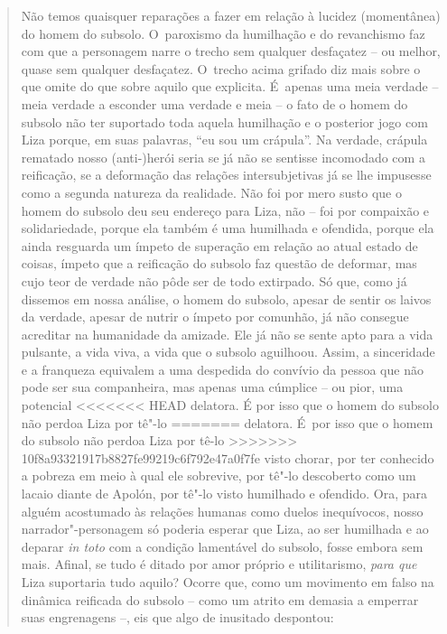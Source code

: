 {\begin{quote}
Não temos quaisquer reparações a fazer em relação à lucidez (momentânea)
do homem do subsolo. O~paroxismo da humilhação e do revanchismo faz com
que a personagem narre o trecho sem qualquer desfaçatez -- ou melhor,
quase sem qualquer desfaçatez. O~trecho acima grifado diz mais sobre o
que omite do que sobre aquilo que explicita. É~apenas uma meia verdade
-- meia verdade a esconder uma verdade e meia -- o fato de o homem do
subsolo não ter suportado toda aquela humilhação e o posterior jogo com
Liza porque, em suas palavras, ``eu sou um crápula''. Na verdade,
crápula rematado nosso (anti-)herói seria se já não se sentisse
incomodado com a reificação, se a deformação das relações
intersubjetivas já se lhe impusesse como a segunda natureza da
realidade. Não foi por mero susto que o homem do subsolo deu seu
endereço para Liza, não -- foi por compaixão e solidariedade, porque ela
também é uma humilhada e ofendida, porque ela ainda resguarda um ímpeto
de superação em relação ao atual estado de coisas, ímpeto que a
reificação do subsolo faz questão de deformar, mas cujo teor de verdade
não pôde ser de todo extirpado. Só que, como já dissemos em nossa
análise, o homem do subsolo, apesar de sentir os laivos da verdade,
apesar de nutrir o ímpeto por comunhão, já não consegue acreditar na
humanidade da amizade. Ele já não se sente apto para a vida pulsante, a
vida viva, a vida que o subsolo aguilhoou. Assim, a sinceridade e a
franqueza equivalem a uma despedida do convívio da pessoa que não pode
ser sua companheira, mas apenas uma cúmplice -- ou pior, uma potencial
<<<<<<< HEAD
delatora. É por isso que o homem do subsolo não perdoa Liza por tê"-lo
=======
delatora. É~por isso que o homem do subsolo não perdoa Liza por tê-lo
>>>>>>> 10f8a93321917b8827fe99219c6f792e47a0f7fe
visto chorar, por ter conhecido a pobreza em meio à qual ele sobrevive,
por tê"-lo descoberto como um lacaio diante de Apolón, por tê"-lo visto
humilhado e ofendido. Ora, para alguém acostumado às relações humanas
como duelos inequívocos, nosso narrador"-personagem só poderia esperar
que Liza, ao ser humilhada e ao deparar \emph{in toto} com a condição
lamentável do subsolo, fosse embora sem mais. Afinal, se tudo é ditado
por amor próprio e utilitarismo, \emph{para que} Liza suportaria tudo
aquilo? Ocorre que, como um movimento em falso na dinâmica reificada do
subsolo -- como um atrito em demasia a emperrar suas engrenagens --, eis
que algo de inusitado despontou:


\end{quote}}
